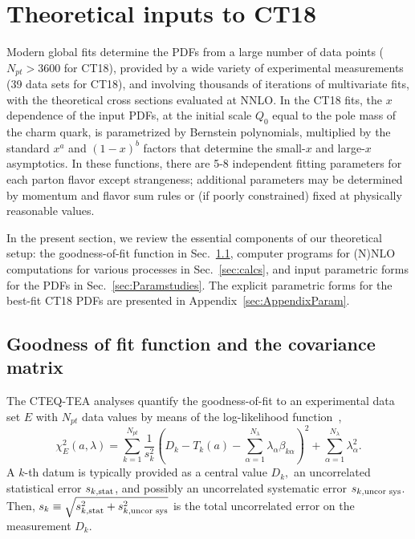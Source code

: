 \section{Theoretical inputs to CT18
\label{sec:Theory}}

Modern global fits  determine the PDFs from 
a large number of data points ($N_\mathit{pt}\! >\! 3600$ for CT18), provided by a wide variety of experimental measurements
(39 data sets for CT18), and involving thousands of
iterations of multivariate fits, with the theoretical cross sections evaluated at NNLO.
In the CT18 fits, the $x$ dependence of the input PDFs, at the initial scale $Q_0$ equal to the pole mass of the charm quark, is parametrized by
Bernstein polynomials, multiplied by the standard $x^a$ and $(1-x)^b$ factors that determine the small-$x$ and large-$x$ asymptotics.  In these functions, there are 5-8 independent
fitting parameters for each parton flavor except strangeness; additional parameters may be determined by momentum and 
flavor sum rules or (if poorly constrained) fixed at physically reasonable values.

In the present section, we review the essential components of our theoretical setup: the goodness-of-fit function in  Sec.~\ref{sec:chi2}, 
computer programs for (N)NLO computations for various processes  in Sec.~\ref{sec:calcs}, and 
input parametric forms for the PDFs in Sec.~\ref{sec:Paramstudies}. The explicit parametric forms for the best-fit CT18 PDFs are presented in 
Appendix~\ref{sec:AppendixParam}. 

\subsection{Goodness of fit function and the covariance matrix}
\label{sec:chi2}
The CTEQ-TEA analyses quantify the goodness-of-fit to an experimental data set
$E$ with $N_{pt}$
data values by means of the log-likelihood function~\cite{Pumplin:2002vw},
\begin{equation}
\chi_{E}^{2}(a,\lambda)=\sum_{k=1}^{N_{pt}}\frac{1}{s_{k}^{2}}\left(D_{k}-T_{k}(a)-\sum_{\alpha=1}^{N_{\lambda}}\lambda_{\alpha}\beta_{k\alpha}\right)^{2}+\sum_{\alpha=1}^{N_{\lambda}}\lambda_{\alpha}^{2}.\label{Chi2sys}
\end{equation}
A $k$-th datum is typically provided as a central value $D_{k},$ an uncorrelated
statistical error $s_{k,\mbox{\scriptsize stat}}$, and possibly an
uncorrelated systematic error
$s_{k,\mbox{\scriptsize uncor sys}}$.
Then, $s_{k}\equiv \sqrt{s_{k,\mbox{\scriptsize stat}}^{2}+s_{k,\mbox{\scriptsize uncor sys}}^{2}}$
is the total uncorrelated error on the measurement $D_{k}$.

